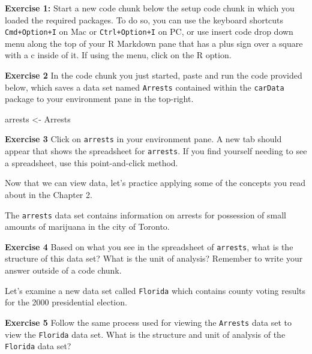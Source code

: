 \documentclass[
]{book}
\makeatletter
\newenvironment{Shaded}{\begin{snugshade}}{\end{snugshade}}
\newcommand{\NormalTok}[1]{#1}
\newcommand{\OtherTok}[1]{\textcolor[rgb]{0.37,0.37,0.37}{#1}}
\newenvironment{kframe}{%
\medskip{}
\setlength{\fboxsep}{.8em}
 \def\at@end@of@kframe{}%
 \ifinner\ifhmode%
  \def\at@end@of@kframe{\end{minipage}}%
  \begin{minipage}{\columnwidth}%
 \fi\fi%
 \def\FrameCommand##1{\hskip\@totalleftmargin \hskip-\fboxsep
 \colorbox{shadecolor}{##1}\hskip-\fboxsep
     \hskip-\linewidth \hskip-\@totalleftmargin \hskip\columnwidth}%
 \MakeFramed {\advance\hsize-\width
   \@totalleftmargin\z@ \linewidth\hsize
   \@setminipage}}%
 {\par\unskip\endMakeFramed%
 \at@end@of@kframe}
\renewenvironment{Shaded}{\begin{kframe}}{\end{kframe}}
\newenvironment{rmdblock}[1]
  {\begin{shaded*}
  }
  {\end{shaded*}
  }
\newenvironment{learncheck}
  {\begin{rmdblock}{warning}}
  {\end{rmdblock}}
\makeatother
\begin{document}
\begin{learncheck}
\textbf{Exercise 1:} Start a new code chunk below the setup code chunk
in which you loaded the required packages. To do so, you can use the
keyboard shortcuts \texttt{Cmd+Option+I} on Mac or
\texttt{Ctrl+Option+I} on PC, or use insert code drop down menu along
the top of your R Markdown pane that has a plus sign over a square with
a c inside of it. If using the menu, click on the R option.
\end{learncheck}

\begin{learncheck}
\textbf{Exercise 2} In the code chunk you just started, paste and run
the code provided below, which saves a data set named \texttt{Arrests}
contained within the \texttt{carData} package to your environment pane
in the top-right.
\end{learncheck}

\begin{Shaded}
\begin{Highlighting}[]
\NormalTok{arrests }\OtherTok{\textless{}{-}}\NormalTok{ Arrests}
\end{Highlighting}
\end{Shaded}

\begin{learncheck}
\textbf{Exercise 3} Click on \texttt{arrests} in your environment pane.
A new tab should appear that shows the spreadsheet for \texttt{arrests}.
If you find yourself needing to see a spreadsheet, use this
point-and-click method.
\end{learncheck}

Now that we can view data, let's practice applying some of the concepts you read about in the Chapter 2.

The \texttt{arrests} data set contains information on arrests for possession of small amounts of marijuana in the city of Toronto.

\begin{learncheck}
\textbf{Exercise 4} Based on what you see in the spreadsheet of
\texttt{arrests}, what is the structure of this data set? What is the
unit of analysis? Remember to write your answer outside of a code chunk.
\end{learncheck}

Let's examine a new data set called \texttt{Florida} which contains county voting results for the 2000 presidential election.

\begin{learncheck}
\textbf{Exercise 5} Follow the same process used for viewing the
\texttt{Arrests} data set to view the \texttt{Florida} data set. What is
the structure and unit of analysis of the \texttt{Florida} data set?
\end{learncheck}
\end{document}
